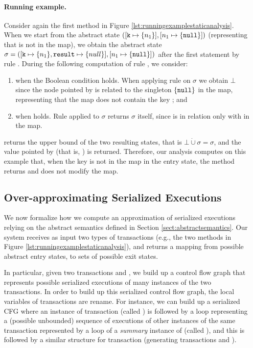 \paragraph{Running example.}
Consider again the first method in Figure \ref{lst:runningexamplestaticanalysis}. When we start from the abstract state  $([\mathtt{k} \mapsto \{n_1\}], [n_1 \mapsto \{\mathtt{null}\}])$ (representing that  is not in the map), we obtain the abstract state $\sigma = ([\mathtt{k} \mapsto \{n_1\}, \mathtt{result} \mapsto \{null\}], [n_1 \mapsto \{\mathtt{null}\}])$ after the first statement by rule . During the following computation of rule , we consider:
\begin{enumerate}
	\item when the Boolean condition  holds. When applying rule  on $\sigma$ we obtain $\bot$ since the node pointed by  is related to the singleton $\{\mathtt{null}\}$ in the map, representing that the map does not contain the key ; and
	\item when  holds. Rule  applied to $\sigma$ returns $\sigma$ itself, since  is in relation only with  in the map.
\end{enumerate}
 returns the upper bound of the two resulting states, that is $\bot \dot{\cup} \sigma = \sigma$, and the value pointed by  (that is, ) is returned.
Therefore, our analysis computes on this example that, when the key is not in the map in the entry state, the method returns  and does not modify the map.

\subsection{Over-approximating Serialized Executions}
We now formalize how we compute an approximation of serialized executions relying on the abstract semantics defined in Section \ref{sect:abstractsemantics}. Our system receives as input two types of transactions (e.g., the two methods in Figure \ref{lst:runningexamplestaticanalysis}), and returns a mapping from possible abstract entry states, to sets of possible exit states.

In particular, given two transactions  and , we build up a control flow graph that represents possible serialized executions of many instances of the two transactions. In order to build up this serialized control flow graph, the local variables of transactions are rename. For instance, we can build up a serialized CFG where an instance of transaction  (called ) is followed by a loop representing a (possible unbounded) sequence of executions of other instances of the same transaction represented by a loop of a \emph{summary} instance of  (called ), and this is followed by a similar structure for transaction  (generating transactions  and ).

